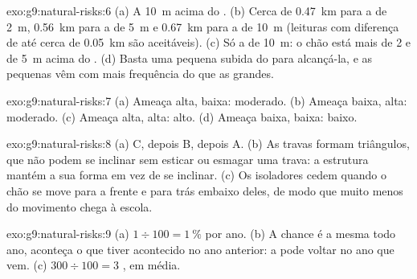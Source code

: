 \begin{solution}{exo:g9:natural-risks:6}
(a) A  \qty{10}{m} acima do . (b) Cerca de \qty{0.47}{km}
para a  de \qty{2}{m}, \qty{0.56}{km} para a de \qty{5}{m} e
\qty{0.67}{km} para a de \qty{10}{m} (leituras com diferença de até cerca
de \qty{0.05}{km} são aceitáveis). (c) Só a  de \qty{10}{m}: o
chão está mais de 2 e de \qty{5}{m} acima do . (d) Basta uma pequena
subida do  para alcançá-la, e as  pequenas vêm com mais
frequência do que as grandes.
\end{solution}

\begin{solution}{exo:g9:natural-risks:7}
(a) Ameaça alta,  baixa:  moderado. (b) Ameaça baixa,
 alta:  moderado. (c) Ameaça alta, 
alta:  alto. (d) Ameaça baixa,  baixa:  baixo.
\end{solution}

\begin{solution}{exo:g9:natural-risks:8}
(a) C, depois B, depois A. (b) As travas formam triângulos, que não podem
se inclinar sem esticar ou esmagar uma trava: a estrutura mantém a sua
forma em vez de se inclinar. (c) Os isoladores cedem quando o chão se
move para a frente e para trás embaixo deles, de modo que muito menos do
movimento chega à escola.
\end{solution}

\begin{solution}{exo:g9:natural-risks:9}
(a) $1 \div 100 = 1~\%$ por ano. (b) A chance é a mesma todo ano,
aconteça o que tiver acontecido no ano anterior: a  pode voltar
no ano que vem. (c) $300 \div 100 = 3$ , em média.
\end{solution}


